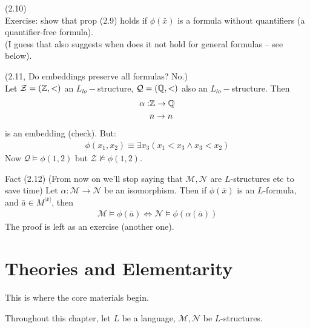 \documentclass[a4paper]{article}
\begin{document}
\begin{prop} (2.10)\\
    Exercise: show that prop (2.9) holds if $\phi(\bar{x})$ is a formula without quantifiers (a quantifier-free formula).\\
    (I guess that also suggests when does it not hold for general formulas -- see below).
\end{prop}

\begin{eg} (2.11, Do embeddings preserve all formulas? No.)\\
Let $\mathcal{Z} = (\mathbb{Z},<)$ an $L_{lo}-$structure, $\mathcal{Q}=(\mathbb{Q},<)$ also an $L_{lo}-$structure. Then
\begin{equation*}
    \begin{aligned}
        \alpha: &\mathbb{Z} \to \mathbb{Q}\\
        &n \to n
    \end{aligned}
\end{equation*}
is an embedding (check). But:
\begin{equation*}
    \begin{aligned}
        \phi(x_1,x_2) \equiv \exists x_3(x_1<x_3 \wedge x_3 < x_2)
    \end{aligned}
\end{equation*}
Now $\mathcal{Q} \vDash \phi(1,2)$ but $\mathcal{Z} \not\vDash \phi(1,2)$.
\end{eg}

Fact (2.12) (From now on we'll stop saying that $\mathcal{M},\mathcal{N}$ are $L$-structures etc to save time) Let $\alpha: \mathcal{M} \to \mathcal{N}$ be an isomorphism. Then if $\phi(\bar{x})$ is an $L$-formula, and $\bar{a} \in M^{|\bar{x}|}$, then
\begin{equation*}
    \begin{aligned}
        \mathcal{M} \vDash \phi(\bar{a}) \iff \mathcal{N} \vDash \phi(\alpha(\bar{a}))
    \end{aligned}
\end{equation*}
The proof is left as an exercise (another one).

\newpage

\section{Theories and Elementarity}

This is where the core materials begin.

Throughout this chapter, let $L$ be a language, $\mathcal{M},\mathcal{N}$ be $L$-structures.
\end{document}
